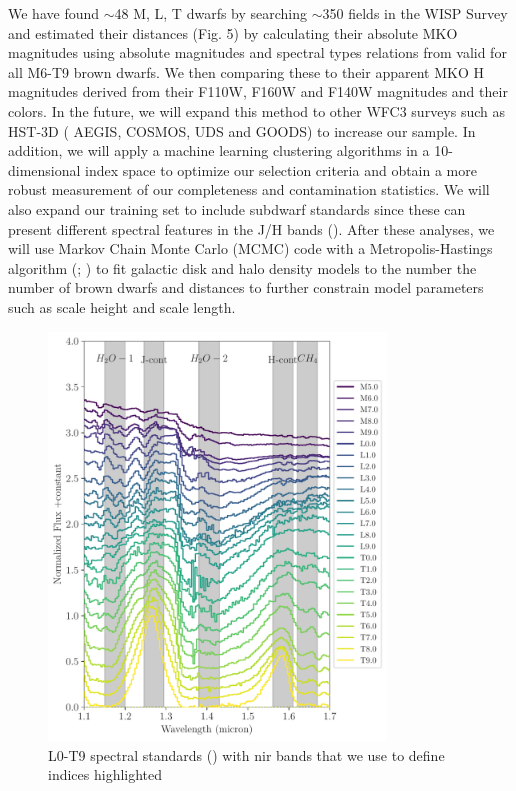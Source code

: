 \documentclass[preprint]{aastex}
\begin{document}
We have found $\sim$48 M, L, T dwarfs by searching $\sim$350 fields in the WISP Survey and estimated their distances (Fig. 5) by calculating their absolute MKO magnitudes using absolute magnitudes and spectral types relations from \citet{2012ApJS..201...19D}  valid for all M6-T9 brown dwarfs. We then comparing these to their apparent MKO H magnitudes derived from their F110W, F160W and F140W magnitudes and their colors. In the future, we will expand this method to other WFC3 surveys such as HST-3D ( AEGIS, COSMOS, UDS and GOODS) to increase our sample. In addition, we will apply a machine learning clustering algorithms in a 10-dimensional index space to optimize our selection criteria and obtain a more robust measurement of our completeness and contamination statistics. We will also expand our training set to include subdwarf standards since these can present different spectral features in the J/H bands (\citealt{2007ApJ...669.1235L}). After these analyses, we will use  Markov Chain Monte Carlo (MCMC) code with a Metropolis-Hastings algorithm (\citealt{1953JChPh..21.1087M}; \citealt{HASTINGS01041970}) to fit galactic disk and halo density models to the number the number of brown dwarfs and distances to further constrain model parameters such as scale height and scale length.
\clearpage
\begin{figure}[!htb]
\center
{}
\includegraphics[width=0.8\textwidth]{../Figures/standards.pdf}
\caption{ L0-T9 spectral standards (\citealt{2010ApJS..190..100K}) with nir bands that we use to define indices highlighted }
\end{figure}
\end{document}
